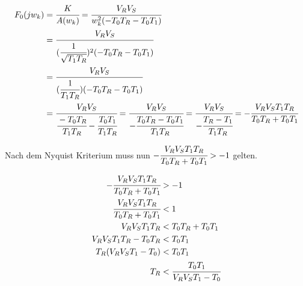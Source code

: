 \begin{equation} \label{eq5}
\begin{split}
 F_0(jw_k) &= \cfrac{K}{A(w_k)} = \cfrac{V_RV_S}{w_k^2(-T_0T_R-T_0T_1)} \\
 &= \cfrac{V_RV_S}{(\cfrac{1}{\sqrt{T_1T_R}})^2(-T_0T_R-T_0T_1)} \\
 &= \cfrac{V_RV_S}{(\cfrac{1}{T_1T_R})(-T_0T_R-T_0T_1)} \\
 &= \cfrac{V_RV_S}{\cfrac{-T_0T_R}{T_1T_R}-\cfrac{T_0T_1}{T_1T_R}} = \cfrac{V_RV_S}{-\cfrac{T_0T_R-T_0T_1}{T_1T_R}} = \cfrac{V_RV_S}{-\cfrac{T_R-T_1}{T_1T_R}} = -\cfrac{V_RV_ST_1T_R}{T_0T_R+T_0T_1} \\
 \end{split}
\end{equation}

Nach dem Nyquist Kriterium muss nun $-\cfrac{V_RV_ST_1T_R}{T_0T_R+T_0T_1} > -1$ gelten.

\begin{equation} \label{eq5}
\begin{split}
-\cfrac{V_RV_ST_1T_R}{T_0T_R+T_0T_1} &> -1 \\
\cfrac{V_RV_ST_1T_R}{T_0T_R+T_0T_1} &< 1 \\
V_RV_ST_1T_R &< T_0T_R+T_0T_1 \\
V_RV_ST_1T_R-T_0T_R &< T_0T_1 \\
T_R(V_RV_ST_1-T_0) &< T_0T_1 \\
T_R &< \cfrac{T_0T_1}{V_RV_ST_1-T_0} \\
 \end{split}
\end{equation}

